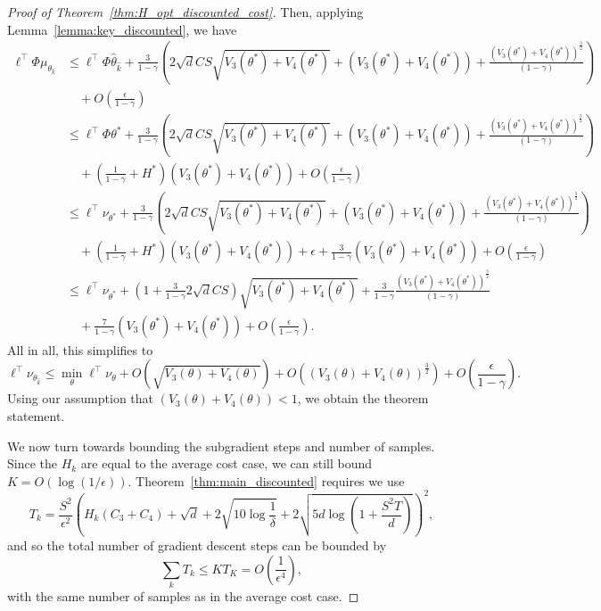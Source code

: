 \documentclass[11pt]{article}
\newcounter{assumption}%
\begin{document}
\begin{proof}[Proof of Theorem~\ref{thm:H_opt_discounted_cost}]
Then, applying Lemma~\ref{lemma:key_discounted}, we have
\begin{align*}
  \ell^\top\Phi\mu_{\theta_{\hat k}}
  &\leq
    \ell^\top\Phi\widehat\theta_{\hat k}
    + \frac{3}{1-\gamma}\left(2\sqrt{d}CS\sqrt{V_3(\theta^*) + V_4(\theta^*)}
    + \left(V_3(\theta^*) + V_4(\theta^*)\right)
    +\frac{\left(V_3(\theta^*) + V_4(\theta^*)\right)^{\frac{3}{2}}}{(1-\gamma)}
    \right)\\
    &\quad+ O\left(\frac{\epsilon}{1-\gamma}\right)\\
  &\leq
    \ell^\top\Phi\theta^*
    + \frac{3}{1-\gamma}\left(2\sqrt{d}CS\sqrt{V_3(\theta^*) + V_4(\theta^*)}
    + \left(V_3(\theta^*) + V_4(\theta^*)\right)
    +\frac{\left(V_3(\theta^*) + V_4(\theta^*)\right)^{\frac{3}{2}}}{(1-\gamma)}
    \right)\\
  &\quad
      + \left(\frac{1}{1-\gamma}+H^*\right)\left(V_3(\theta^*) + V_4(\theta^*)\right)
     + O\left(\frac{\epsilon}{1-\gamma}\right)\\
  &\leq
    \ell^\top\nu_{\theta^*}
    + \frac{3}{1-\gamma}\left(2\sqrt{d}CS\sqrt{V_3(\theta^*) + V_4(\theta^*)}
    + \left(V_3(\theta^*) + V_4(\theta^*)\right)
    +\frac{\left(V_3(\theta^*) + V_4(\theta^*)\right)^{\frac{3}{2}}}{(1-\gamma)}
    \right)\\
  &\quad
      + \left(\frac{1}{1-\gamma}+H^*\right)\left(V_3(\theta^*) + V_4(\theta^*)\right)
    + \epsilon + \frac{3}{1-\gamma}\left(V_3(\theta^*) + V_4(\theta^*)\right)
    + O\left(\frac{\epsilon}{1-\gamma}\right)\\
  &\leq
    \ell^\top\nu_{\theta^*}
    + \left(1+\frac{3}{1-\gamma}2\sqrt{d}CS\right)\sqrt{V_3(\theta^*) + V_4(\theta^*)}
    +\frac{3}{1-\gamma}\frac{\left(V_3(\theta^*) + V_4(\theta^*)\right)^{\frac{3}{2}}}{(1-\gamma)}\\
  &\quad
    + \frac{7}{1-\gamma}\left(V_3(\theta^*) + V_4(\theta^*)\right)+O\left(\frac{\epsilon}{1-\gamma}\right).
\end{align*}
All in all, this simplifies to
\begin{equation*}
  \ell^\top\nu_{\theta_{\hat k}} \leq \min_\theta \ell^\top\nu_\theta
  + O\left(\sqrt{V_3(\theta)+V_4(\theta)}\right)
  + O\left(\left(V_3(\theta)+V_4(\theta)\right)^{\frac{3}{2}}\right)
+ O\left(\frac{\epsilon}{1-\gamma}\right).
\end{equation*}
Using our assumption that $(V_3(\theta)+V_4(\theta))<1$, we obtain the theorem statement.

We now turn towards bounding the subgradient steps and number of samples. Since the $H_k$ are equal to the average cost case, we can still bound $K=O(\log(1/\epsilon))$. Theorem~\ref{thm:main_discounted} requires we use
\[
  T_k =
  \frac{S^2}{\epsilon^2}
  \left(H_k(C_3+C_4)+\sqrt{d}+2\sqrt{10 \log\frac{1}{\delta}}+2\sqrt{5d \log \left( 1 + \frac{S^2 T}{d} \right)}\right)^2,
\]
and so the total number of gradient descent steps can be bounded by
\begin{equation*}
  \sum_k T_k \leq K T_K
  =
  O\left(
    \frac{1}{\epsilon^4}
    \right),
  \end{equation*}
with the same number of samples as in the average cost case.
\end{proof}
\end{document}
